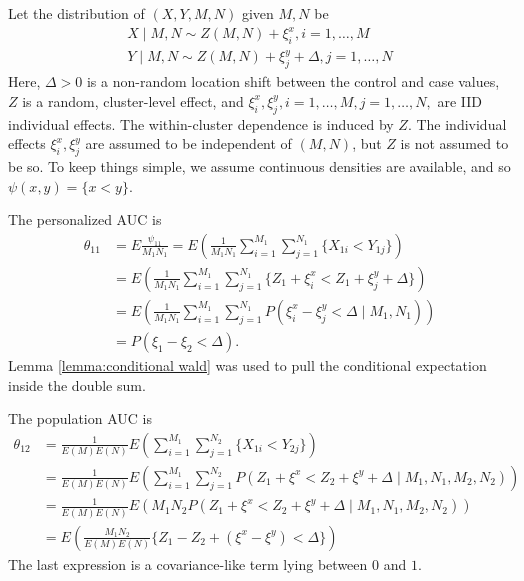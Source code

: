 \documentclass[12pt]{article}
\DeclareMathOperator{\AUC}{AUC}
\newcommand{\E}{E}
\renewcommand{\P}{P}
\newcommand{\cind}{\perp \!\!\! \perp}
\newcommand{\aucindiv}{\theta_{11}}%
\newcommand{\aucpop}{\theta_{12}}%
\newcommand{\kernel}{\psi}
\newcommand{\Kernel}{\psi}
\begin{document}
Let the distribution of $(X,Y,M,N)$ given $M,N$ be
\begin{align}
  X \mid M,N \sim Z(M,N) + \xi_i^x, i=1,\ldots,M\\
  Y \mid M,N \sim Z(M,N) + \xi_j^y + \Delta, j=1,\ldots,N
  \label{model:random effects}
\end{align}
Here, $\Delta>0$ is a non-random location shift between the control and
case values, $Z$ is a random, cluster-level effect, and
$\xi_i^x, \xi_j^y,i=1,\ldots,M,j=1,\ldots,N,$ are IID
individual effects. The within-cluster dependence is induced by
$Z$. The individual effects $\xi_i^x, \xi_j^y$ are assumed to be
independent of $(M,N)$, but $Z$ is not assumed to be so. To keep
things simple, we assume continuous densities are available, and so
$\kernel(x,y)=\{x<y\}$.%

The personalized AUC is
\begin{align}
  \aucindiv &= \E\frac{\Kernel_{11}}{M_1N_1} 
          = \E \left(\frac{1}{M_1N_1} \sum_{i=1}^{M_1}\sum_{j=1}^{N_1}\{X_{1i}<Y_{1j}\}\right)\\
          &= \E\left( \frac{1}{M_1N_1} \sum_{i=1}^{M_1}\sum_{j=1}^{N_1}\{Z_1+\xi^x_i<Z_1+\xi_j^y+\Delta\}\right)\\
          &= \E \left(\frac{1}{M_1N_1} \sum_{i=1}^{M_1}\sum_{j=1}^{N_1}
            \P(\xi_i^x-\xi_j^y<\Delta\mid M_1,N_1)\right)\\
          &=\P(\xi_1 - \xi_2 < \Delta).\label{eqn:examples:aucindiv}
\end{align}
Lemma \ref{lemma:conditional wald} was used to pull the conditional expectation inside
the double sum.

The population AUC is
\begin{align}
  \aucpop &= \frac{1}{\E(M)\E(N)}\E\left( \sum_{i=1}^{M_1}\sum_{j=1}^{N_2}\{X_{1i}<Y_{2j}\}\right)\\
          &=\frac{1}{\E(M)\E(N)}\E \left(\sum_{i=1}^{M_1}\sum_{j=1}^{N_2}
            \P(Z_1 + \xi^x < Z_2 + \xi^y + \Delta \mid M_1,N_1,M_2,N_2)\right)\\
          &=\frac{1}{\E(M)\E(N)}\E \left(M_1N_2
            \P(Z_1 + \xi^x < Z_2 + \xi^y + \Delta \mid M_1,N_1,M_2,N_2)\right)\\
          &=\E\left(\frac{M_1N_2}{\E(M)\E(N)} \{Z_1-Z_2 + (\xi^x-\xi^y)<\Delta\} \right)\label{eqn:examples:aucpop}
\end{align}
The last expression is a covariance-like term lying between $0$ and $1$.
\end{document}
